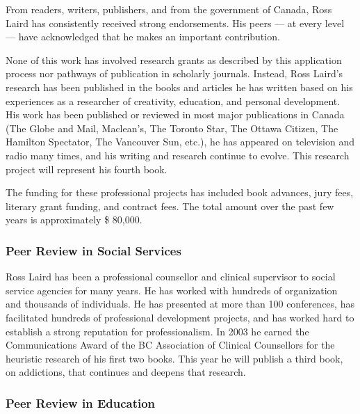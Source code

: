 \documentclass[letterpaper,10pt,headsepline]{scrreprt}
\begin{document}
From readers, writers, publishers, and from the government of Canada, Ross
Laird has consistently received strong endorsements. His peers --- at every
level --- have acknowledged that he makes an important contribution.

None of this work has involved research grants as described by this
application process nor pathways of publication in scholarly journals.
Instead, Ross Laird's research has been published in the books and articles he
has written based on his experiences as a researcher of creativity, education,
and personal development. His work has been published or reviewed in most
major publications in Canada (The Globe and Mail, Maclean's, The Toronto Star,
The Ottawa Citizen, The Hamilton Spectator, The Vancouver Sun, etc.), he has
appeared on television and radio many times, and his writing and research
continue to evolve. This research project will represent his fourth book.

The funding for these professional projects has included book advances, jury
fees, literary grant funding, and contract fees. The total amount over the
past few years is approximately \$ 80,000.

\subsubsection{Peer Review in Social Services}

Ross Laird has been a professional counsellor and clinical supervisor to
social service agencies for many years. He has worked with hundreds of
organization and thousands of individuals. He has presented at more than 100
conferences, has facilitated hundreds of professional development projects,
and has worked hard to establish a strong reputation for professionalism. In
2003 he earned the Communications Award of the BC Association of Clinical
Counsellors for the heuristic research of his first two books. This year he
will publish a third book, on addictions, that continues and deepens that
research.

\subsubsection{Peer Review in Education}
\end{document}
